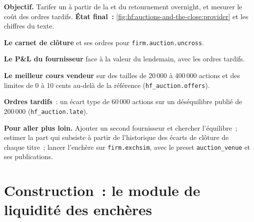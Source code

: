 \begin{tutorial}
\textbf{Objectif.} Tarifer un  à partir de la  et du retournement overnight, et mesurer le coût des ordres tardifs.
\textbf{État final~:} \cref{fig:hf:auctions-and-the-close:provider} et les chiffres du texte.
\begin{tutsteps}
\item \textbf{Le carnet de clôture} et ses ordres pour \texttt{firm.auction.uncross}.
\label{lst:hf:auctions-and-the-close:book}
\item \textbf{Le P\&L du fournisseur} face à la valeur du lendemain, avec les ordres tardifs.
\label{lst:hf:auctions-and-the-close:provider}
\item \textbf{Le meilleur cours vendeur} sur des tailles de 20\,000 à 400\,000 actions et des limites de 0 à 10 cents au-delà de la référence (\texttt{hf\_auction.offers}).
\item \textbf{Ordres tardifs}~: un écart type de 60\,000 actions sur un déséquilibre publié de 200\,000 (\texttt{hf\_auction.late}).
\end{tutsteps}
\textbf{Pour aller plus loin.} Ajouter un second fournisseur et chercher l'équilibre~; estimer la part qui subsiste à partir de l'historique
des écarts de clôture de chaque titre~; lancer l'enchère sur \texttt{firm.exchsim}, avec le preset \texttt{auction\_venue} et ses publications.
\end{tutorial}

\section{Construction~: le module de liquidité des enchères}\label{bld:hf:auctions-and-the-close:auctionmm}


